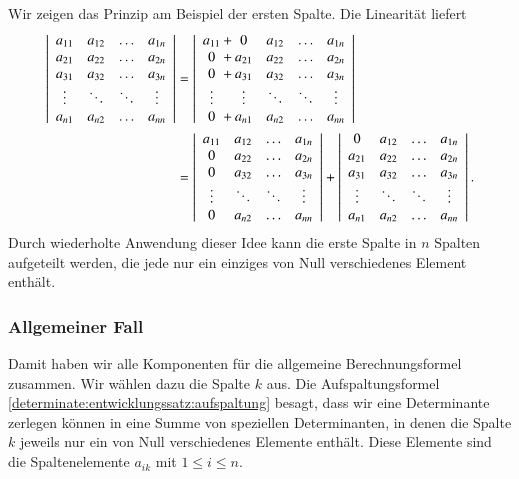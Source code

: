 Wir zeigen das Prinzip am Beispiel der ersten Spalte.
Die Linearität liefert
\begin{align}
\left|\begin{array}{cccc}
a_{11}&a_{12}&\dots &a_{1n}\\
a_{21}&a_{22}&\dots &a_{2n}\\
a_{31}&a_{32}&\dots &a_{3n}\\
\vdots&\ddots&\ddots&\vdots\\
a_{n1}&a_{n2}&\dots &a_{nn}\\
\end{array}\right|
&=
\left|\begin{array}{c@{\hskip2pt}c@{\hskip2pt}cccc}
a_{11}&+&  0   &a_{12}&\dots &a_{1n}\\
  0   &+&a_{21}&a_{22}&\dots &a_{2n}\\
  0   &+&a_{31}&a_{32}&\dots &a_{3n}\\
\vdots& &\vdots&\ddots&\ddots&\vdots\\
  0   &+&a_{n1}&a_{n2}&\dots &a_{nn}\\
\end{array}\right|
\notag
\\
&=
\left|\begin{array}{cccc}
a_{11}&a_{12}&\dots &a_{1n}\\
  0   &a_{22}&\dots &a_{2n}\\
  0   &a_{32}&\dots &a_{3n}\\
\vdots&\ddots&\ddots&\vdots\\
  0   &a_{n2}&\dots &a_{nn}\\
\end{array}\right|
+
\left|\begin{array}{cccc}
  0   &a_{12}&\dots &a_{1n}\\
a_{21}&a_{22}&\dots &a_{2n}\\
a_{31}&a_{32}&\dots &a_{3n}\\
\vdots&\ddots&\ddots&\vdots\\
a_{n1}&a_{n2}&\dots &a_{nn}\\
\end{array}\right|.
\label{determinate:entwicklungssatz:aufspaltung}
\end{align}
Durch wiederholte Anwendung dieser Idee kann die erste Spalte in $n$
Spalten aufgeteilt werden, die jede nur ein einziges von Null verschiedenes
Element enthält.

\subsubsection{Allgemeiner Fall}
Damit haben wir alle Komponenten für die allgemeine Berechnungsformel
zusammen.
Wir wählen dazu die Spalte $k$ aus.
Die Aufspaltungsformel
\eqref{determinate:entwicklungssatz:aufspaltung}
besagt, dass wir eine Determinante zerlegen können in eine Summe von
speziellen Determinanten, in denen die Spalte $k$ jeweils nur ein
von Null verschiedenes Elemente enthält.
Diese Elemente sind die Spaltenelemente $a_{ik}$ mit $1\le i\le n$.


